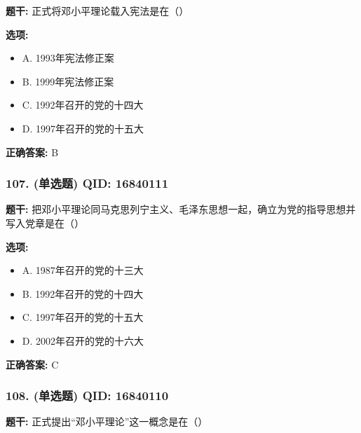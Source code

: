 \documentclass[12pt,UTF8]{ctexart}
\begin{document}
\textbf{题干:}
正式将邓小平理论载入宪法是在（）

\textbf{选项:}
\begin{itemize}[leftmargin=*]

  \item A. 1993年宪法修正案

  \item B. 1999年宪法修正案

  \item C. 1992年召开的党的十四大

  \item D. 1997年召开的党的十五大

\end{itemize}

\textbf{正确答案:}
B

\vspace{0.3em}\hrulefill\vspace{0.7em}

\subsubsection*{107. (单选题) \small QID: 16840111}

\textbf{题干:}
把邓小平理论同马克思列宁主义、毛泽东思想一起，确立为党的指导思想并写入党章是在（）

\textbf{选项:}
\begin{itemize}[leftmargin=*]

  \item A. 1987年召开的党的十三大

  \item B. 1992年召开的党的十四大

  \item C. 1997年召开的党的十五大

  \item D. 2002年召开的党的十六大

\end{itemize}

\textbf{正确答案:}
C

\vspace{0.3em}\hrulefill\vspace{0.7em}

\subsubsection*{108. (单选题) \small QID: 16840110}

\textbf{题干:}
正式提出“邓小平理论”这一概念是在（）
\end{document}
